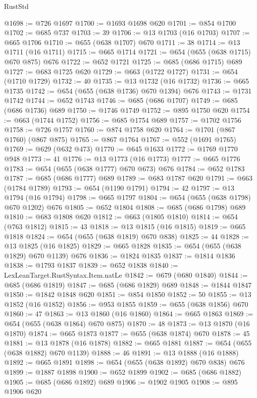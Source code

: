 \begin{lexlean}{RustStd}
\begin{coremodule}
@1698 := @726 @1697
@1700 := @1693 @1698 @620
@1701 := @854 @1700
@1702 := @685 @737
@1703 := 39
@1706 := @13 @1703 (@16 @1703)
@1707 := @665 @1706
@1710 := @655 (@638 @1707) @670
@1711 := 38
@1714 := @13 @1711 (@16 @1711)
@1715 := @665 @1714
@1721 := @654 (@655 (@638 @1715) @670 @875) @676
@1722 := @652 @1721
@1725 := @685 (@686 @1715) @689
@1727 := @683 @1725 @620
@1729 := @663 (@1722 @1727)
@1731 := @654 (@1710 @1729)
@1732 := 40
@1735 := @13 @1732 (@16 @1732)
@1736 := @665 @1735
@1742 := @654 (@655 (@638 @1736) @670 @1394) @676
@1743 := @1731 @1742
@1744 := @652 @1743
@1746 := @685 (@686 @1707)
@1749 := @685 (@686 @1736) @689
@1750 := @1746 @1749
@1752 := @895 @1750 @620
@1754 := @663 (@1744 @1752)
@1756 := @685 @1754 @689
@1757 := @1702 @1756
@1758 := @726 @1757
@1760 := @874 @1758 @620
@1764 := @1701 (@867 @1760) (@867 @875)
@1765 := @867 @1764
@1767 := @552 (@1691 @1765)
@1769 := @629 (@632 @473)
@1770 := @645 @1633
@1772 := @1769 @1770 @948
@1773 := 41
@1776 := @13 @1773 (@16 @1773)
@1777 := @665 @1776
@1783 := @654 (@655 (@638 @1777) @670 @673) @676
@1784 := @652 @1783
@1787 := @685 (@686 @1777) @689
@1789 := @683 @1787 @620
@1791 := @663 (@1784 @1789)
@1793 := @654 (@1190 @1791)
@1794 := 42
@1797 := @13 @1794 (@16 @1794)
@1798 := @665 @1797
@1804 := @654 (@655 (@638 @1798) @670 @1202) @676
@1805 := @652 @1804
@1808 := @685 (@686 @1798) @689
@1810 := @683 @1808 @620
@1812 := @663 (@1805 @1810)
@1814 := @654 (@763 @1812)
@1815 := 43
@1818 := @13 @1815 (@16 @1815)
@1819 := @665 @1818
@1824 := @654 (@655 (@638 @1819) @670 @838)
@1825 := 44
@1828 := @13 @1825 (@16 @1825)
@1829 := @665 @1828
@1835 := @654 (@655 (@638 @1829) @670 @1139) @676
@1836 := @1824 @1835
@1837 := @1814 @1836
@1838 := @1793 @1837
@1839 := @652 @1838
@1840 := LexLeanTarget.RustSyntax.Item.natLe
@1842 := @679 (@680 @1840)
@1844 := @685 (@686 @1819)
@1847 := @685 (@686 @1829) @689
@1848 := @1844 @1847
@1850 := @1842 @1848 @620
@1851 := @854 @1850
@1852 := 50
@1855 := @13 @1852 (@16 @1852)
@1856 := @953 @1855
@1859 := @655 (@638 @1856) @670
@1860 := 47
@1863 := @13 @1860 (@16 @1860)
@1864 := @665 @1863
@1869 := @654 (@655 (@638 @1864) @670 @875)
@1870 := 48
@1873 := @13 @1870 (@16 @1870)
@1874 := @665 @1873
@1877 := @655 (@638 @1874) @670
@1878 := 45
@1881 := @13 @1878 (@16 @1878)
@1882 := @665 @1881
@1887 := @654 (@655 (@638 @1882) @670 @1139)
@1888 := 46
@1891 := @13 @1888 (@16 @1888)
@1892 := @665 @1891
@1898 := @654 (@655 (@638 @1892) @670 @838) @676
@1899 := @1887 @1898
@1900 := @652 @1899
@1902 := @685 (@686 @1882)
@1905 := @685 (@686 @1892) @689
@1906 := @1902 @1905
@1908 := @895 @1906 @620

\end{coremodule}
\end{lexlean}
